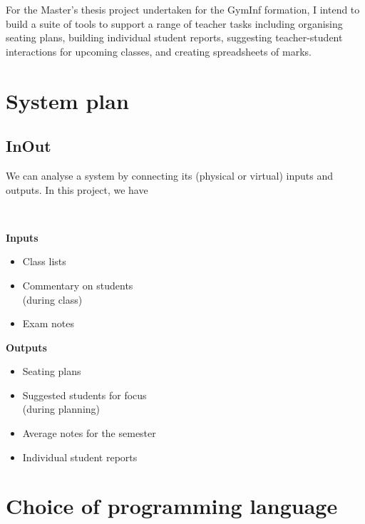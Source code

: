 \documentclass[10pt]{article}
\begin{document}
For the Master's thesis project undertaken for the GymInf formation, I intend to build a suite of tools to support a range of teacher tasks including organising seating plans, building individual student reports, suggesting teacher-student interactions for upcoming classes, and creating spreadsheets of marks.

\section{System plan}

\subsection{InOut}

We can analyse a system by connecting its (physical or virtual) inputs and outputs. In this project, we have

\

\begin{minipage}[t]{0.45\textwidth}

\textbf{Inputs}

\begin{itemize}
\item Class lists
\item Commentary on students \\
(during class)
\item Exam notes
\end{itemize}


\end{minipage}
\hfill
\vline
\hfill
\begin{minipage}[t]{0.45\textwidth}

\textbf{Outputs}

\begin{itemize}
\item Seating plans
\item Suggested students for focus \\
(during planning)
\item Average notes for the semester
\item Individual student reports
\end{itemize}



\end{minipage}

\section{Choice of programming language}
\end{document}
